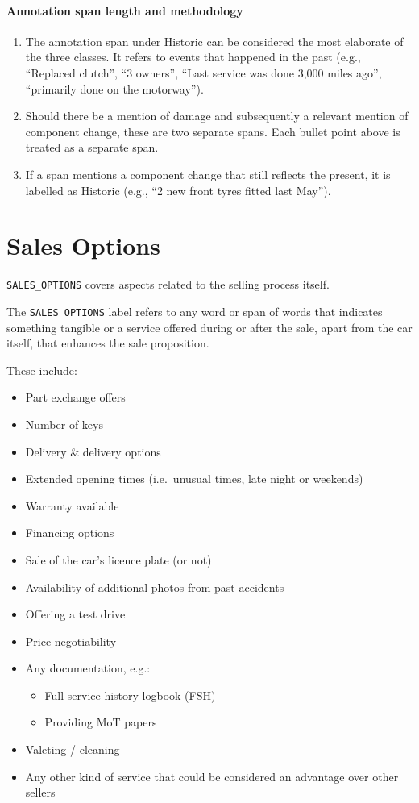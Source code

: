 \documentclass[11pt,a4paper]{article}
\newcommand{\lbl}[1]{\texttt{#1}}
\begin{document}
\paragraph{Annotation span length and methodology}
\begin{enumerate}
\item The annotation span under Historic can be considered the most elaborate of the three
classes. It refers to events that happened in the past (e.g., ``Replaced clutch'', ``3 owners'',
``Last service was done 3,000 miles ago'', ``primarily done on the motorway'').
\item Should there be a mention of damage and subsequently a relevant mention of component
change, these are two separate spans. Each bullet point above is treated as a separate span.
\item If a span mentions a component change that still reflects the present, it is labelled as
Historic (e.g., ``2 new front tyres fitted last May'').
\end{enumerate}

\section*{Sales Options}
\lbl{SALES\_OPTIONS} covers aspects related to the selling process itself.

\begin{tcolorbox}[colback=gray!5!white, colframe=gray!75!black, title=Definition]
The \lbl{SALES\_OPTIONS} label refers to any word or span of words that indicates something
tangible or a service offered during or after the sale, apart from the car itself, that enhances
the sale proposition.
\end{tcolorbox}

These include:
\begin{itemize}
    \item Part exchange offers
    \item Number of keys
    \item Delivery \& delivery options
    \item Extended opening times (i.e.\ unusual times, late night or weekends)
    \item Warranty available
    \item Financing options
    \item Sale of the car's licence plate (or not)
    \item Availability of additional photos from past accidents
    \item Offering a test drive
    \item Price negotiability
    \item Any documentation, e.g.:
        \begin{itemize}
            \item Full service history logbook (FSH)
            \item Providing MoT papers
        \end{itemize}
    \item Valeting / cleaning
    \item Any other kind of service that could be considered an advantage over other sellers
\end{itemize}
\end{document}

